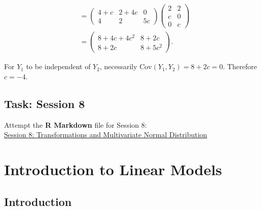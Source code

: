 \documentclass[
]{book}
\begin{document}
\begin{enumerate}
\begin{align*}
  &= \begin{pmatrix} 4+c & 2+4c & 0 \\ 4 & 2 & 5c \end{pmatrix} \begin{pmatrix} 2 & 2 \\ c & 0 \\ 0 & c \end{pmatrix} \\[3pt]
  &= \begin{pmatrix} 8+4c+4c^2 & 8+2c \\ 8+2c & 8+5c^2 \end{pmatrix}.
  \end{align*}
\end{enumerate}

For \(Y_1\) to be independent of \(Y_2\), necessarily \(\text{Cov}(Y_1,Y_2) = 8+2c = 0\). Therefore \(c=-4\).

\hypertarget{MV_Normal:lab}{%
\section*{\texorpdfstring{{\textbf{Task: Session 8}}}{Task: Session 8}}\label{MV_Normal:lab}}

Attempt the \textbf{R Markdown} file for Session 8:\\
\href{https://moodle.nottingham.ac.uk/course/view.php?id=134982\#section-2}{Session 8: Transformations and Multivariate Normal Distribution}

\hypertarget{Sec_LinearI}{%
\chapter{Introduction to Linear Models}\label{Sec_LinearI}}

\hypertarget{Sec_LinearI:intro}{%
\section{Introduction}\label{Sec_LinearI:intro}}
\end{document}
